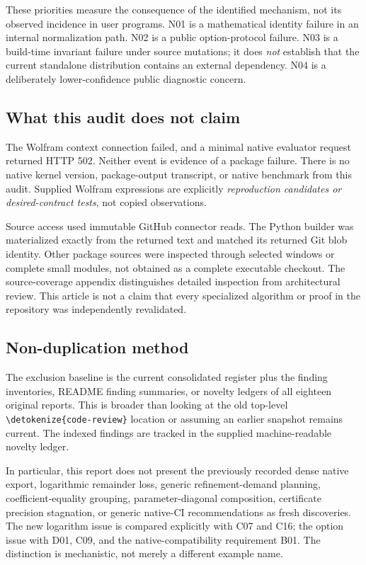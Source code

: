 \documentclass[11pt,a4paper]{article}
\newcommand{\wl}[1]{\texttt{\expandafter\nolinkurl\expandafter{\detokenize{#1}}}}
\begin{document}
These priorities measure the consequence of the identified mechanism, not its
observed incidence in user programs. N01 is a mathematical identity failure in an
internal normalization path. N02 is a public option-protocol failure. N03 is a
build-time invariant failure under source mutations; it does \emph{not} establish
that the current standalone distribution contains an external dependency. N04 is
a deliberately lower-confidence public diagnostic concern.\cite{core,native,builder}

\subsection{What this audit does not claim}

The Wolfram context connection failed, and a minimal native evaluator request
returned HTTP 502. Neither event is evidence of a package failure. There is no
native kernel version, package-output transcript, or native benchmark from this
audit. Supplied Wolfram expressions are explicitly \emph{reproduction candidates
or desired-contract tests}, not copied observations.

Source access used immutable GitHub connector reads. The Python builder was
materialized exactly from the returned text and matched its returned Git blob
identity. Other package sources were inspected through selected windows or
complete small modules, not obtained as a complete executable checkout. The
source-coverage appendix distinguishes detailed inspection from architectural
review. This article is not a claim that every specialized algorithm or proof in
the repository was independently revalidated.

\subsection{Non-duplication method}

The exclusion baseline is the current consolidated register plus the finding
inventories, README finding summaries, or novelty ledgers of all eighteen
original reports. This is broader than looking at the old top-level
\wl{code-review} location or assuming an earlier snapshot remains current.
The indexed findings are tracked in the supplied machine-readable novelty
ledger.\cite{status,index}

In particular, this report does not present the previously recorded dense native
export, logarithmic remainder loss, generic refinement-demand planning,
coefficient-equality grouping, parameter-diagonal composition, certificate
precision stagnation, or generic native-CI recommendations as fresh discoveries.
The new logarithm issue is compared explicitly with C07 and C16; the option issue
with D01, C09, and the native-compatibility requirement B01. The distinction is
mechanistic, not merely a different example name.
\end{document}
